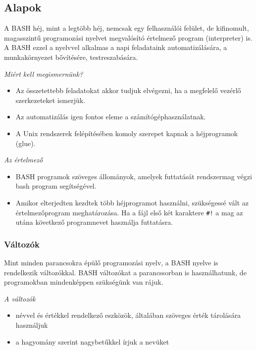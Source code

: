 \subsection{Alapok}
A BASH héj, mint a legtöbb héj, nemcsak egy felhasználói felület, de kifinomult, magasszintű programozási nyelvet megvalósító értelmező program (interpreter) is. A BASH ezzel a nyelvvel alkalmas a napi feladataink automatizálására, a munkakörnyezet bővítésére, testreszabására.
\bigskip

	\emph{Miért kell megismernünk?}
	\begin{itemize}
	\item Az összetettebb feladatokat akkor tudjuk elvégezni, ha a megfelelő vezérlő szerkezeteket ismerjük.
	\item Az automatizálás igen fontos eleme a számítógéphasználatnak.
	\item A Unix rendszerek felépítésében komoly szerepet kapnak a héjprogramok (glue).
	\end{itemize}


	\emph{Az értelmező}
	\begin{itemize}
	\item BASH programok szöveges állományok, amelyek futtatását rendszermag végzi
	bash program segítségével.
	\item Amikor elterjedten kezdtek több héjprogramot használni, szükségessé vált az
	értelmezőprogram meg\-ha\-tá\-ro\-zá\-sa. Ha a fájl első két karaktere \verb.#!. a mag az utána 
	 következő programnevet használja futtatásra.
	\end{itemize}

\subsubsection*{Változók}
Mint minden parancsokra épülő programozási nyelv, a BASH nyelve is rendelkezik változókkal. BASH változókat a parancssorban is használhatunk,
de programokban mindenképpen szükségünk van rájuk. \smallskip

	\emph{A változók}
	\begin{itemize}
	\item névvel és értékkel rendelkező eszközök, általában szöveges érték tárolására használjuk
	\item a hagyomány szerint nagybetűkkel írjuk a nevüket
	\end{itemize}

